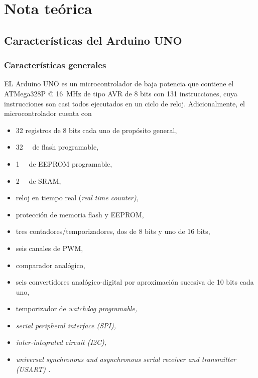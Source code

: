 \section{Nota teórica}

\subsection{Características del Arduino UNO}
\subsubsection{Características generales}
EL Arduino UNO es un microcontrolador de baja potencia que contiene el ATMega328P @ \SI{16}{\mega\hertz} de tipo AVR de 8 bits con 131 instrucciones, cuya instrucciones son casi todos ejecutados en un ciclo de reloj. Adicionalmente, el microcontrolador cuenta con
\begin{itemize}
    \item 32 registros de 8 bits cada uno de propósito general,
    \item \SI{32}{\kilo\byte} de flash programable,
    \item \SI{1}{\kilo\byte} de EEPROM programable,
    \item \SI{2}{\kilo\byte} de SRAM,
    \item reloj en tiempo real (\it{real time counter}), 
    \item protección de memoria flash y EEPROM,
    \item tres contadores/temporizadores, dos de 8 bits y uno de 16 bits,
    \item seis canales de PWM,
    \item comparador analógico,
    \item seis convertidores analógico-digital por aproximación sucesiva de 10 bits cada uno,
    \item temporizador de \it{watchdog} programable,
    \item \it{serial peripheral interface} (SPI),
    \item \it{inter-integrated circuit} (I2C),
    \item \it{universal synchronous and asynchronous serial receiver and transmitter} (USART) \cite{datasheet, atmega}.
\end{itemize}
